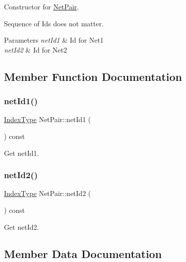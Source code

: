 Constructor for \hyperlink{classNetPair}{Net\+Pair}. 

Sequence of Ids does not matter.


\begin{DoxyParams}{Parameters}
{\em net\+Id1} & Id for Net1 \\
\hline
{\em net\+Id2} & Id for Net2 \\
\hline
\end{DoxyParams}


\subsection{Member Function Documentation}
\mbox{\label{classNetPair_af1c6bf90836ede9e23922283eb1f6ddb}} 
\subsubsection{\texorpdfstring{net\+Id1()}{netId1()}}
{\footnotesize\ttfamily \hyperlink{type_8h_a581e8093e28e7362f2b6937296190676}{Index\+Type} Net\+Pair\+::net\+Id1 (\begin{DoxyParamCaption}{ }\end{DoxyParamCaption}) const\hspace{0.3cm}{\ttfamily [inline]}}



Get net\+Id1. 

\mbox{\label{classNetPair_a17069b7125980ea5dee5d62741bd06f8}} 
\subsubsection{\texorpdfstring{net\+Id2()}{netId2()}}
{\footnotesize\ttfamily \hyperlink{type_8h_a581e8093e28e7362f2b6937296190676}{Index\+Type} Net\+Pair\+::net\+Id2 (\begin{DoxyParamCaption}{ }\end{DoxyParamCaption}) const\hspace{0.3cm}{\ttfamily [inline]}}



Get net\+Id2. 



\subsection{Member Data Documentation}
\mbox{\label{classNetPair_a0fb84b09859d2fecc32a91b63f46a90b}} 
